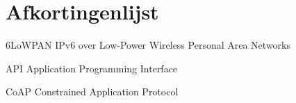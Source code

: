 
\section*{Afkortingenlijst}

\begin{abbreviations}
\item[6LoWPAN] IPv6 over Low-Power Wireless Personal Area Networks
\item[API] Application Programming Interface
\item[CoAP] Constrained Application Protocol
\end{abbreviations}
